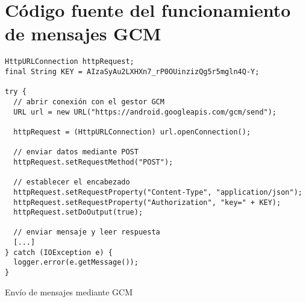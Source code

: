 \section{Código fuente del funcionamiento de mensajes GCM}
\begin{listing}
\begin{minipage}{.4\textwidth}
\begin{verbatim}
HttpURLConnection httpRequest;
final String KEY = AIzaSyAu2LXHXn7_rP0OUinzizQg5r5mgln4Q-Y;

try {
  // abrir conexión con el gestor GCM
  URL url = new URL("https://android.googleapis.com/gcm/send");

  httpRequest = (HttpURLConnection) url.openConnection();

  // enviar datos mediante POST
  httpRequest.setRequestMethod("POST");

  // establecer el encabezado
  httpRequest.setRequestProperty("Content-Type", "application/json");
  httpRequest.setRequestProperty("Authorization", "key=" + KEY);
  httpRequest.setDoOutput(true);
  
  // enviar mensaje y leer respuesta
  [...]
} catch (IOException e) {
  logger.error(e.getMessage());
}
\end{verbatim}
\end{minipage}
\caption{Envío de mensajes mediante GCM}\label{alg:gcmFuncionamientoMensajes}
\end{listing}
